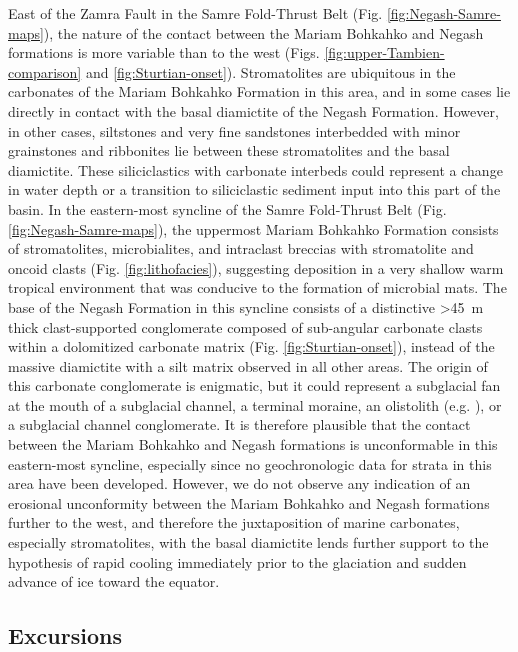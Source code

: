 East of the Zamra Fault in the Samre Fold-Thrust Belt (Fig. \ref{fig:Negash-Samre-maps}), the nature of the contact between the Mariam Bohkahko and Negash formations is more variable than to the west (Figs. \ref{fig:upper-Tambien-comparison} and \ref{fig:Sturtian-onset}). Stromatolites are ubiquitous in the carbonates of the Mariam Bohkahko Formation in this area, and in some cases lie directly in contact with the basal diamictite of the Negash Formation. However, in other cases, siltstones and very fine sandstones interbedded with minor grainstones and ribbonites lie between these stromatolites and the basal diamictite. These siliciclastics with carbonate interbeds could represent a change in water depth or a transition to siliciclastic sediment input into this part of the basin. In the eastern-most syncline of the Samre Fold-Thrust Belt (Fig. \ref{fig:Negash-Samre-maps}), the uppermost Mariam Bohkahko Formation consists of stromatolites, microbialites, and intraclast breccias with stromatolite and oncoid clasts (Fig. \ref{fig:lithofacies}), suggesting deposition in a very shallow warm tropical environment that was conducive to the formation of microbial mats. The base of the Negash Formation in this syncline consists of a distinctive \textgreater45~m thick clast-supported conglomerate composed of sub-angular carbonate clasts within a dolomitized carbonate matrix (Fig. \ref{fig:Sturtian-onset}), instead of the massive diamictite with a silt matrix observed in all other areas. The origin of this carbonate conglomerate is enigmatic, but it could represent a subglacial fan at the mouth of a subglacial channel, a terminal moraine, an olistolith (e.g. \citealp{LeHeron2014a}), or a subglacial channel conglomerate. It is therefore plausible that the contact between the Mariam Bohkahko and Negash formations is unconformable in this eastern-most syncline, especially since no geochronologic data for strata in this area have been developed. However, we do not observe any indication of an erosional unconformity between the Mariam Bohkahko and Negash formations further to the west, and therefore the juxtaposition of marine carbonates, especially stromatolites, with the basal diamictite lends further support to the hypothesis of rapid cooling immediately prior to the glaciation and sudden advance of ice toward the equator.

\subsection{\dC Excursions}

